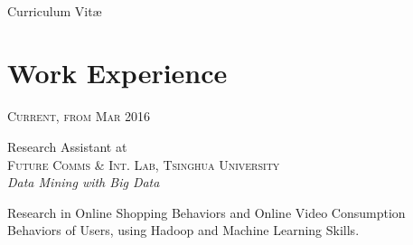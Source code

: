 \documentclass[10pt]{article} %
\begin{document}
\color{text1} %


\par{\\ %
{\color{headings} Curriculum {Vit\ae}\\[15pt]\par} %
	

\begin{minipage}[t]{0.5\textwidth} %
\vspace{0pt} %
	

\section{Work Experience} 


{\raggedleft\textsc{Current, from Mar 2016}\par}

{\raggedright\large Research Assistant at \\ \textsc{Future Comms \& Int. Lab, Tsinghua University}
\\
\textit{Data Mining with Big Data}\\[5pt]}

\normalsize{Research in Online Shopping Behaviors and Online Video Consumption Behaviors of Users, using Hadoop and Machine Learning Skills.}\\



\end{minipage}}
\end{document}
